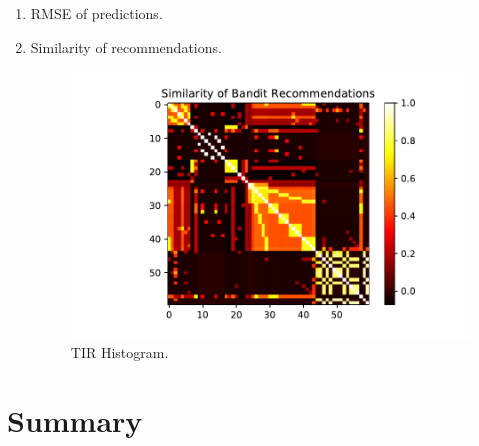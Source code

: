 \documentclass{article}
\begin{document}
\begin{enumerate}
    \item RMSE of predictions.
    
    \item Similarity of recommendations. 
    \begin{figure}[t]
    \centering
    \includegraphics[scale=0.7]{plots/similarity_first_round_recommendation.pdf}
    \caption{TIR Histogram.}
    \label{fig: TIR Histogram.}
\end{figure}
\end{enumerate}{}

\section{Summary}

\newpage

\printbibliography

\clearpage

\appendix

\end{document}
